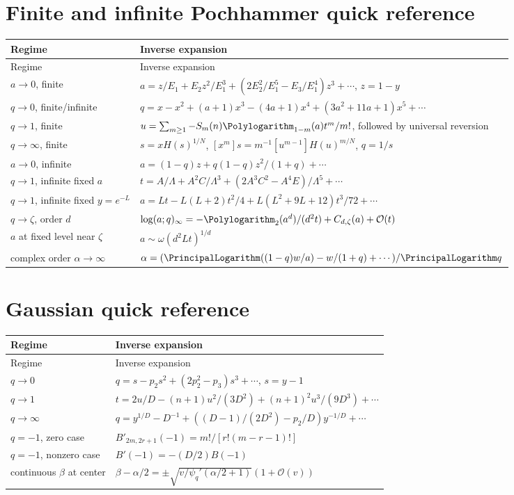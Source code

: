 \documentclass[11pt,oneside]{book}
\theoremstyle{definition}
\theoremstyle{remark}
\newcommand{\OO}{\mathcal{O}}
\begin{document}
\section{Finite and infinite Pochhammer quick reference}
\begin{longtable}{>{\raggedright\arraybackslash}p{}
                  >{\raggedright\arraybackslash}p{}}
\toprule
Regime & Inverse expansion\\
\midrule
\endfirsthead
\toprule
Regime & Inverse expansion\\
\midrule
\endhead
$a\to0$, finite &
$a=z/E_1+E_2z^2/E_1^3+(2E_2^2/E_1^5-E_3/E_1^4)z^3+\cdots$, $z=1-y$\\
$q\to0$, finite/infinite &
$q=x-x^2+(a+1)x^3-(4a+1)x^4+(3a^2+11a+1)x^5+\cdots$\\
$q\to1$, finite &
$u=\sum_{m\ge1}-S_m(n)\Polylogarithm_{1-m}(a)t^m/m!$, followed by universal reversion\\
$q\to\infty$, finite &
$s=xH(s)^{1/N}$, $[x^m]s=m^{-1}[u^{m-1}]H(u)^{m/N}$, $q=1/s$\\
$a\to0$, infinite &
$a=(1-q)z+q(1-q)z^2/(1+q)+\cdots$\\
$q\to1$, infinite fixed $a$ &
$t=A/\Lambda+A^2C/\Lambda^3+(2A^3C^2-A^4E)/\Lambda^5+\cdots$\\
$q\to1$, infinite fixed $y=e^{-L}$ &
$a=Lt-L(L+2)t^2/4+L(L^2+9L+12)t^3/72+\cdots$\\
$q\to\zeta$, order $d$ &
$\log(a;q)_\infty=-\Polylogarithm_2(a^d)/(d^2t)+C_{d,\zeta}(a)+\OO(t)$\\
$a$ at fixed level near $\zeta$ &
$a\sim\omega(d^2Lt)^{1/d}$\\
complex order $\alpha\to\infty$ &
$\alpha=(\PrincipalLogarithm((1-q)w/a)-w/(1+q)+\cdots)/\PrincipalLogarithm q$\\
\bottomrule
\end{longtable}

\section{Gaussian quick reference}
\begin{longtable}{>{\raggedright\arraybackslash}p{}
                  >{\raggedright\arraybackslash}p{}}
\toprule
Regime & Inverse expansion\\
\midrule
\endfirsthead
\toprule
Regime & Inverse expansion\\
\midrule
\endhead
$q\to0$ & $q=s-p_2s^2+(2p_2^2-p_3)s^3+\cdots$, $s=y-1$\\
$q\to1$ & $t=2u/D-(n+1)u^2/(3D^2)+(n+1)^2u^3/(9D^3)+\cdots$\\
$q\to\infty$ & $q=y^{1/D}-D^{-1}+((D-1)/(2D^2)-p_2/D)y^{-1/D}+\cdots$\\
$q=-1$, zero case & $B'_{2m,2r+1}(-1)=m!/[r!(m-r-1)!]$\\
$q=-1$, nonzero case & $B'(-1)=-(D/2)B(-1)$\\
continuous $\beta$ at center &
$\beta-\alpha/2=\pm\sqrt{v/\psi_q'(\alpha/2+1)}(1+\OO(v))$\\
\bottomrule
\end{longtable}
\end{document}
